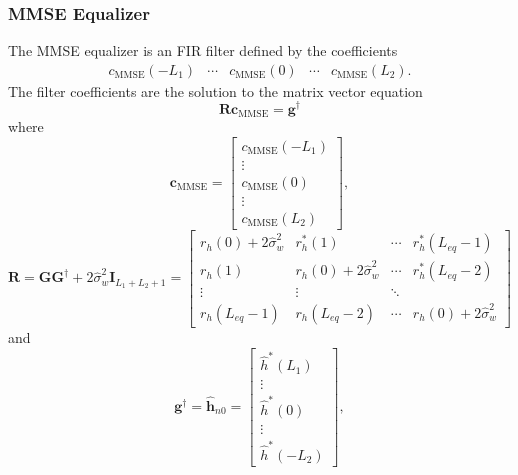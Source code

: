 \subsubsection{MMSE Equalizer}
The MMSE equalizer is an FIR filter defined by the coefficients
\begin{equation}
\begin{matrix}
c_\text{MMSE}(-L_1) & \cdots & c_\text{MMSE}(0) & \cdots & c_\text{MMSE}(L_2).
\end{matrix}
\end{equation}
The filter coefficients are the solution to the matrix vector equation \cite[eq. (330) and (333)]{PAQ-phase1}
\begin{equation}
\mathbf{R} \mathbf{c}_\text{MMSE} = \mathbf{g}^\dagger
\label{eq:start_here_MMSE}
\end{equation}
where
\begin{equation}
\mathbf{c}_\text{MMSE} = 
\begin{bmatrix}
c_\text{MMSE}(-L_1) \\ \vdots \\ c_\text{MMSE}(0) \\ \vdots \\ c_\text{MMSE}(L_2)
\end{bmatrix},
\end{equation}
\begin{equation}
\mathbf{R} = 
\mathbf{G}\mathbf{G}^\dagger + 2\hat{\sigma}^2_w \mathbf{I}_{L_1+L_2+1} = 
\begin{bmatrix}
r_{h}(0) + 2\hat{\sigma}^2_w	& r^\ast_{h}(1)							& \cdots 	& r^\ast_{h}(L_{eq}-1) 	\\
r_{h}(1) 						& r_{h}(0) + 2\hat{\sigma}^2_w& \cdots 	& r^\ast_{h}(L_{eq}-2)  			\\
\vdots	 						& \vdots								& \ddots 	&  						\\
r_{h}(L_{eq}-1)					& r_{h}(L_{eq}-2)						& \cdots	& r_{h}(0)+2\hat{\sigma}^2_w  
\end{bmatrix}
\label{eq:R}
\end{equation}
and
\begin{equation}
\mathbf{g}^\dagger = \hat{\mathbf{h}}_{n0} = \begin{bmatrix} \hat{h}^\ast(L_1) \\ \vdots \\ \hat{h}^\ast(0) \\ \vdots \\ \hat{h}^\ast(-L_2)  \end{bmatrix},
\label{eq:g_dagger_h_n0}
\end{equation}
